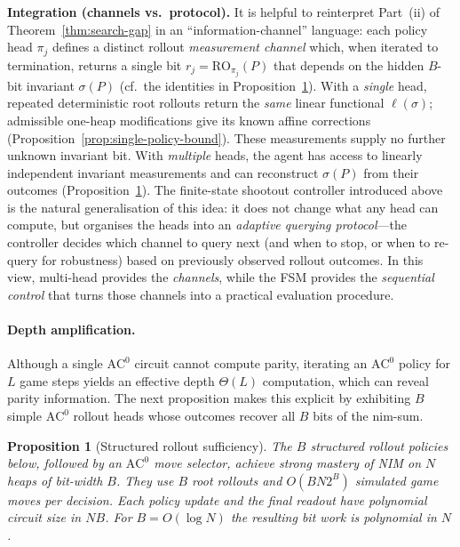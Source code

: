 \documentclass[11pt]{article}
\newcommand{\AC}{\mathrm{AC}}
\theoremstyle{plain}
\newtheorem{proposition}[theorem]{Proposition}
\theoremstyle{definition}
\theoremstyle{remark}
\numberwithin{equation}{section}
\begin{document}
\noindent\textbf{Integration (channels vs.\ protocol).}
It is helpful to reinterpret Part~(ii) of Theorem~\ref{thm:search-gap} in an ``information-channel'' language: each policy head $\pi_j$ defines a distinct rollout \emph{measurement channel} which, when iterated to termination, returns a single bit $r_j=\mathrm{RO}_{\pi_j}(P)$ that depends on the hidden $B$-bit invariant $\sigma(P)$ (cf.\ the identities in Proposition~\ref{prop:rollout-sufficiency}).
With a \emph{single} head, repeated deterministic root rollouts return the \emph{same} linear functional $\ell(\sigma)$; admissible one-heap modifications give its known affine corrections (Proposition~\ref{prop:single-policy-bound}). These measurements supply no further unknown invariant bit.
With \emph{multiple} heads, the agent has access to linearly independent invariant measurements and can reconstruct $\sigma(P)$ from their outcomes (Proposition~\ref{prop:rollout-sufficiency}).
The finite-state shootout controller introduced above is the natural generalisation of this idea: it does not change what any head can compute, but organises the heads into an \emph{adaptive querying protocol}---the controller decides which channel to query next (and when to stop, or when to re-query for robustness) based on previously observed rollout outcomes.
In this view, multi-head provides the \emph{channels}, while the FSM provides the \emph{sequential control} that turns those channels into a practical evaluation procedure.

\paragraph{Depth amplification.}
Although a single $\AC^0$ circuit cannot compute parity, iterating an $\AC^0$ policy for $L$ game steps yields an effective depth $\Theta(L)$ computation, which can reveal parity information.
The next proposition makes this explicit by exhibiting $B$ simple $\AC^0$ rollout heads whose outcomes recover all $B$ bits of the nim-sum.

\begin{proposition}[Structured rollout sufficiency]
\label{prop:rollout-sufficiency}
The $B$ structured rollout policies below, followed by an $\AC^0$ move selector, achieve strong mastery of NIM on $N$ heaps of bit-width $B$. They use $B$ root rollouts and $O(BN2^B)$ simulated game moves per decision. Each policy update and the final readout have polynomial circuit size in $NB$. For $B=O(\log N)$ the resulting bit work is polynomial in $N$.
\end{proposition}
\end{document}
